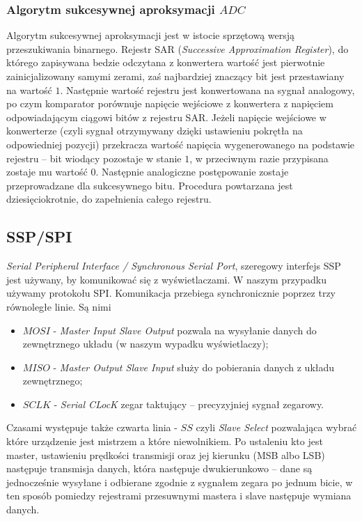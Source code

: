\documentclass[a4paper,12pt,twoside]{article}
\theoremstyle{plain}
\theoremstyle{definition}
\theoremstyle{remark}
\begin{document}
	\subsubsection{Algorytm sukcesywnej aproksymacji $ADC$ \cite{ADCINST}}
	Algorytm sukcesywnej aproksymacji jest w istocie sprzętową wersją przeszukiwania binarnego. Rejestr SAR (\textit{Successive Approximation Register}), do którego zapisywana bedzie odczytana z konwertera wartość jest pierwotnie zainicjalizowany samymi zerami, zaś najbardziej znaczący bit jest przestawiany na wartość $1$. Następnie wartość rejestru jest konwertowana na sygnał analogowy, po czym komparator porównuje napięcie wejściowe z konwertera z napięciem odpowiadającym ciągowi bitów z rejestru SAR. Jeżeli napięcie wejściowe w konwerterze (czyli sygnał otrzymywany dzięki ustawieniu pokrętła na odpowiedniej pozycji) przekracza wartość napięcia wygenerowanego na podstawie rejestru -- bit wiodący pozostaje w stanie $1$, w przeciwnym razie przypisana zostaje mu wartość $0$. Następnie analogiczne postępowanie zostaje przeprowadzane dla sukcesywnego bitu. Procedura powtarzana jest dziesięciokrotnie, do zapełnienia całego rejestru.

\subsection{SSP/SPI}
\textit{Serial Peripheral Interface / Synchronous Serial Port}, szeregowy interfejs SSP jest używany, by komunikować się z wyświetlaczami. W naszym przypadku używamy protokołu SPI. Komunikacja przebiega synchronicznie poprzez trzy równoległe linie. Są nimi
\begin{itemize}
	\item $MOSI$ - \textit{Master Input Slave Output} pozwala na wysyłanie danych do zewnętrznego układu (w naszym wypadku wyświetlaczy);
	\item $MISO$ - \textit{Master Output Slave Input} służy do pobierania danych z układu zewnętrznego;
	\item $SCLK$ - \textit{Serial CLocK} zegar taktujący -- precyzyjniej sygnał zegarowy.
\end{itemize}
	Czasami występuje także czwarta linia - $SS$ czyli \textit{Slave Select} pozwalająca wybrać które urządzenie jest mistrzem a które niewolnikiem. 
	Po ustaleniu kto jest master, ustawieniu prędkości transmisji oraz jej kierunku (MSB albo LSB) następuje transmisja danych, która następuje dwukierunkowo -- dane są jednocześnie wysyłane i odbierane zgodnie z sygnałem zegara po jednum bicie, w ten sposób pomiedzy rejestrami przesuwnymi mastera i slave następuje wymiana danych.
\end{document}
